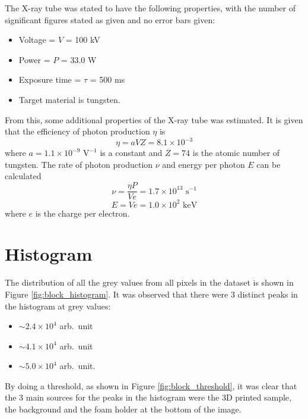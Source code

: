 \documentclass[12pt]{report}
\begin{document}
The X-ray tube was stated to have the following properties, with the number of significant figures stated as given and no error bars given:
\begin{itemize}
	\item Voltage = $V$ = 100 kV
	\item Power = $P$ = 33.0 W
	\item Exposure time = $\tau$ = 500 ms
	\item Target material is tungsten.
\end{itemize}
From this, some additional properties of the X-ray tube was estimated. It is given that the efficiency of photon production $\eta$ is \cite{michael2001x}
\begin{equation}
\eta = aVZ =8.1\times10^{-3}
\end{equation}
where $a=1.1\times 10^{-9}\text{ V}^{-1}$ is a constant and $Z=74$ is the atomic number of tungsten. The rate of photon production $\nu$ and energy per photon $E$ can be calculated
\begin{equation}
\nu =\frac{\eta P}{V e}=1.7\times10^{13}\text{ s}^{-1}
\end{equation}
\begin{equation}
E = Ve = 1.0\times10^{2}\text{ keV}
\end{equation}
where $e$ is the charge per electron.

\section{Histogram}
The distribution of all the grey values from all pixels in the dataset is shown in Figure \ref{fig:block_histogram}. It was observed that there were 3 distinct peaks in the histogram at grey values:
\begin{itemize}
	\item$\sim2.4\times10^4$ arb.~unit
	\item$\sim4.1\times10^4$ arb.~unit
	\item$\sim5.0\times10^4$ arb.~unit.
\end{itemize}
By doing a threshold, as shown in Figure \ref{fig:block_threshold}, it was clear that the 3 main sources for the peaks in the histogram were the 3D printed sample, the background and the foam holder at the bottom of the image.
\end{document}
